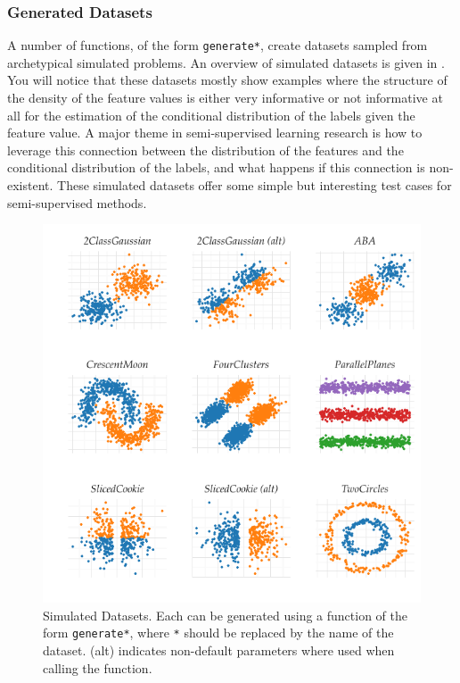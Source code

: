 \documentclass[runningheads,a4paper]{llncs}\usepackage[]{graphicx}\usepackage[]{color}
\makeatletter
\def\maxwidth{ %
  \ifdim\Gin@nat@width>\linewidth
    \linewidth
  \else
    \Gin@nat@width
  \fi
}
\newenvironment{knitrout}{}{} %
\makeatother
\begin{document}
\subsubsection{Generated Datasets}
A number of functions, of the form \texttt{generate*}, create datasets sampled from archetypical simulated problems. An overview of simulated datasets is given in . You will notice that these datasets mostly show examples where the structure of the density of the feature values is either very informative or not informative at all for the estimation of the conditional distribution of the labels given the feature value. A major theme in semi-supervised learning research is how to leverage this connection between the distribution of the features and the conditional distribution of the labels, and what happens if this connection is non-existent. These simulated datasets offer some simple but interesting test cases for semi-supervised methods.
\begin{knitrout}
\color{fgcolor}\begin{figure}
\includegraphics[width=\maxwidth]{figure/generateddatasets-1} \caption[Simulated Datasets]{Simulated Datasets. Each can be generated using a function of the form \texttt{generate*}, where \texttt{*} should be replaced by the name of the dataset. (alt) indicates non-default parameters where used when calling the function.}\label{fig:generateddatasets}
\end{figure}


\end{knitrout}
\end{document}

